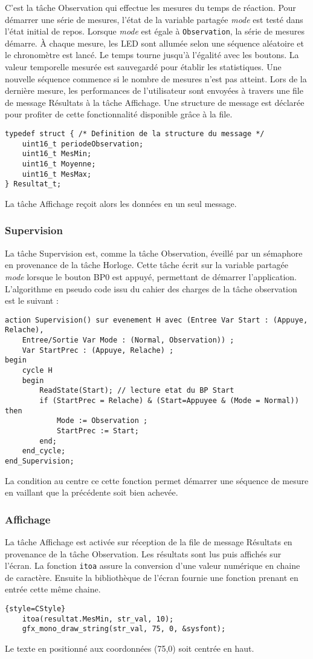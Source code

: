 C'est la tâche Observation qui effectue les mesures du temps de réaction.
Pour démarrer une série de mesures, l'état de la variable partagée \textit{mode} est testé dans l'état initial de repos.
Lorsque \textit{mode} est égale à \texttt{Observation}, la série de mesures démarre.
À chaque mesure, les LED sont allumée selon une séquence aléatoire et le chronomètre est lancé.
Le temps tourne jusqu'à l'égalité avec les boutons.
La valeur temporelle mesurée est sauvegardé pour établir les statistiques.
Une nouvelle séquence commence si le nombre de mesures n'est pas atteint.
Lors de la dernière mesure, les performances de l'utilisateur sont envoyées à travers une file de message Résultats à la tâche Affichage.
Une structure de message est déclarée pour profiter de cette fonctionnalité disponible grâce à la file.
\begin{lstlisting}[style=CStyle]
typedef struct { /* Definition de la structure du message */
	uint16_t periodeObservation;
	uint16_t MesMin;
	uint16_t Moyenne;
	uint16_t MesMax;
} Resultat_t;
\end{lstlisting}
La tâche Affichage reçoit alors les données en un seul message.

\subsubsection{Supervision}
La tâche Supervision est, comme la tâche Observation, éveillé par un sémaphore en provenance de la tâche Horloge.
Cette tâche écrit sur la variable partagée \textit{mode} lorsque le bouton BP0 est appuyé, permettant de démarrer l'application.
L'algorithme en pseudo code issu du cahier des charges de la tâche observation est le suivant :
\begin{lstlisting}[frame=single, basicstyle = \ttfamily \footnotesize]
action Supervision() sur evenement H avec (Entree Var Start : (Appuye, Relache),
    Entree/Sortie Var Mode : (Normal, Observation)) ;
    Var StartPrec : (Appuye, Relache) ;
begin
    cycle H
    begin
        ReadState(Start); // lecture etat du BP Start
        if (StartPrec = Relache) & (Start=Appuyee & (Mode = Normal)) then
            Mode := Observation ;
            StartPrec := Start;
        end;
    end_cycle;
end_Supervision;
\end{lstlisting}
La condition au centre ce cette fonction permet démarrer une séquence de mesure en vaillant que la précédente soit bien achevée.


\subsubsection{Affichage}
La tâche Affichage est activée sur réception de la file de message Résultats en provenance de la tâche Observation.
Les résultats sont lus puis affichés sur l'écran.
La fonction \texttt{itoa} assure la conversion d'une valeur numérique en chaine de caractère.
Ensuite la bibliothèque de l'écran fournie une fonction prenant en entrée cette même chaine.
\begin{lstlisting}{style=CStyle}
    itoa(resultat.MesMin, str_val, 10);
	gfx_mono_draw_string(str_val, 75, 0, &sysfont);
\end{lstlisting}
Le texte en positionné aux coordonnées (75,0) soit centrée en haut.


